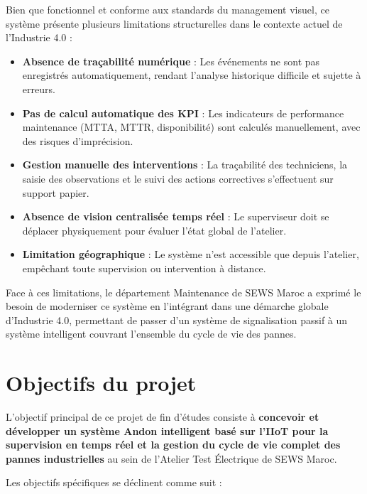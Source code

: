 Bien que fonctionnel et conforme aux standards du management visuel, ce système présente plusieurs limitations structurelles dans le contexte actuel de l'Industrie 4.0 :

\begin{itemize}
    \item \textbf{Absence de traçabilité numérique} : Les événements ne sont pas enregistrés automatiquement, rendant l'analyse historique difficile et sujette à erreurs.
    \item \textbf{Pas de calcul automatique des KPI} : Les indicateurs de performance maintenance (MTTA, MTTR, disponibilité) sont calculés manuellement, avec des risques d'imprécision.
    \item \textbf{Gestion manuelle des interventions} : La traçabilité des techniciens, la saisie des observations et le suivi des actions correctives s'effectuent sur support papier.
    \item \textbf{Absence de vision centralisée temps réel} : Le superviseur doit se déplacer physiquement pour évaluer l'état global de l'atelier.
    \item \textbf{Limitation géographique} : Le système n'est accessible que depuis l'atelier, empêchant toute supervision ou intervention à distance.
\end{itemize}

Face à ces limitations, le département Maintenance de SEWS Maroc a exprimé le besoin de moderniser ce système en l'intégrant dans une démarche globale d'Industrie 4.0, permettant de passer d'un système de signalisation passif à un système intelligent couvrant l'ensemble du cycle de vie des pannes.

\section*{Objectifs du projet}

L'objectif principal de ce projet de fin d'études consiste à \textbf{concevoir et développer un système Andon intelligent basé sur l'IIoT pour la supervision en temps réel et la gestion du cycle de vie complet des pannes industrielles} au sein de l'Atelier Test Électrique de SEWS Maroc.

Les objectifs spécifiques se déclinent comme suit :

